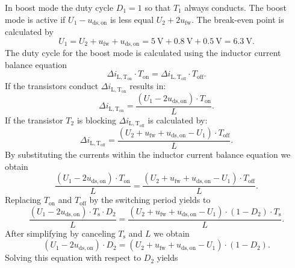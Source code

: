 \begin{solutionblock}
	In boost mode the duty cycle $D_\mathrm{1}=1$ so that $T_\mathrm{1}$ always conducts.
	The boost mode is active if $U_\mathrm{1}-u_\mathrm{ds,on}$ is less equal $U_\mathrm{2}+2u_\mathrm{fw}$. The break-even point is calculated by
	\begin{equation*}
		U_\mathrm{1}=U_\mathrm{2}+ u_\mathrm{fw} + u_\mathrm{ds,on}=\SI{5}{\volt}+\SI{0.8}{\volt}+ \SI{0.5}{\volt}=\SI{6.3}{\volt}.
	\end{equation*}
	The duty cycle for the boost mode is calculated using the inductor current balance equation
	\begin{equation*}
		\Delta i_\mathrm{L,T_\mathrm{on}} \cdot T_\mathrm{on}=\Delta i_\mathrm{L,T_\mathrm{off}} \cdot T_\mathrm{off}.
	\end{equation*}
	If the transistors conduct $\Delta i_\mathrm{L,T_\mathrm{on}}$ results in:
	\begin{equation*}
		\Delta i_\mathrm{L,T_\mathrm{on}}=\frac{(U_\mathrm{1}-2u_\mathrm{ds,on}) \cdot T_\mathrm{on} }{L}.
	\end{equation*}
	If the transistor $T_\mathrm{2}$ is blocking $\Delta i_\mathrm{L,T_\mathrm{off}}$ is calculated by:
	\begin{equation*}
		\Delta i_\mathrm{L,T_\mathrm{off}}=\frac{(U_\mathrm{2}+ u_\mathrm{fw} + u_\mathrm{ds,on}-U_\mathrm{1} ) \cdot T_\mathrm{off}}{L}.
	\end{equation*}
	By substituting the currents within the inductor current balance equation we obtain
	\begin{equation*}
		\frac{(U_\mathrm{1}-2u_\mathrm{ds,on}) \cdot T_\mathrm{on} }{L}=\frac{(U_\mathrm{2}+ u_\mathrm{fw} + u_\mathrm{ds,on}-U_\mathrm{1} ) \cdot T_\mathrm{off}}{L}.
	\end{equation*}
	Replacing $T_\mathrm{on}$ and $T_\mathrm{off}$ by the switching period yields to
	\begin{equation*}
		\frac{(U_\mathrm{1}-2u_\mathrm{ds,on}) \cdot T_\mathrm{s} \cdot D_\mathrm{2}}{L} =
		\frac{(U_\mathrm{2}+ u_\mathrm{fw} + u_\mathrm{ds,on}-U_\mathrm{1}) \cdot (1-D_\mathrm{2}) \cdot T_\mathrm{s}}{L}.
	\end{equation*}
	After simplifying by canceling $T_\mathrm{s}$ and $L$ we obtain
	\begin{equation*}
		(U_\mathrm{1}-2u_\mathrm{ds,on}) \cdot D_\mathrm{2} =
		(U_\mathrm{2}+ u_\mathrm{fw} + u_\mathrm{ds,on}-U_\mathrm{1}) \cdot (1-D_\mathrm{2}).
	\end{equation*}
	Solving this equation with respect to $D_\mathrm{2}$ yields

\end{solutionblock}
